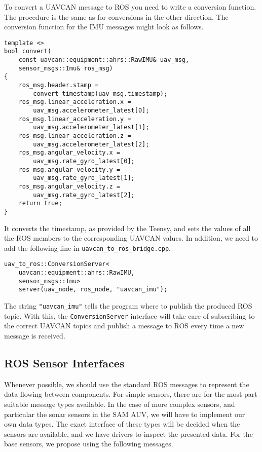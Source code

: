 \documentclass[9pt,technote]{IEEEtran} %
\begin{document}
To convert a UAVCAN message to ROS you need to write a conversion
function. The procedure is the same as for conversions in the
other direction. The conversion function for the IMU messages
might look as follows.
\begin{scriptsize}
\begin{verbatim}
template <>
bool convert(
    const uavcan::equipment::ahrs::RawIMU& uav_msg,
    sensor_msgs::Imu& ros_msg)
{
    ros_msg.header.stamp =
        convert_timestamp(uav_msg.timestamp);
    ros_msg.linear_acceleration.x =
        uav_msg.accelerometer_latest[0];
    ros_msg.linear_acceleration.y =
        uav_msg.accelerometer_latest[1];
    ros_msg.linear_acceleration.z =
        uav_msg.accelerometer_latest[2];
    ros_msg.angular_velocity.x =
        uav_msg.rate_gyro_latest[0];
    ros_msg.angular_velocity.y =
        uav_msg.rate_gyro_latest[1];
    ros_msg.angular_velocity.z =
        uav_msg.rate_gyro_latest[2];
    return true;
}
\end{verbatim}
\end{scriptsize}
It converts the timestamp, as provided by the Teensy,
and sets the values of all the ROS members to the corresponding
UAVCAN values. In addition, we need to add the following
line in \texttt{uavcan\_to\_ros\_bridge.cpp}.
\begin{scriptsize}
\begin{verbatim}
uav_to_ros::ConversionServer<
    uavcan::equipment::ahrs::RawIMU,
    sensor_msgs::Imu>
    server(uav_node, ros_node, "uavcan_imu");
\end{verbatim}
\end{scriptsize}
The string \texttt{"uavcan\_imu"} tells the program where to
publish the produced ROS topic. With this, the \texttt{ConversionServer}
interface will take care of subscribing to the correct UAVCAN topics
and publish a message to ROS every time a new message is received.

\subsection{ROS Sensor Interfaces}
\label{sensors}

Whenever possible, we should use the standard ROS messages
to represent the data flowing between components.
For simple sensors, there are for the most part suitable
message types available. In the case of more complex sensors,
and particular the sonar sensors in the SAM AUV, we will
have to implement our own data types. The exact interface
of these types will be decided when the sensors are available, and
we have drivers to inspect the presented data.
For the base sensors, we propose using the following messages.
\end{document}
